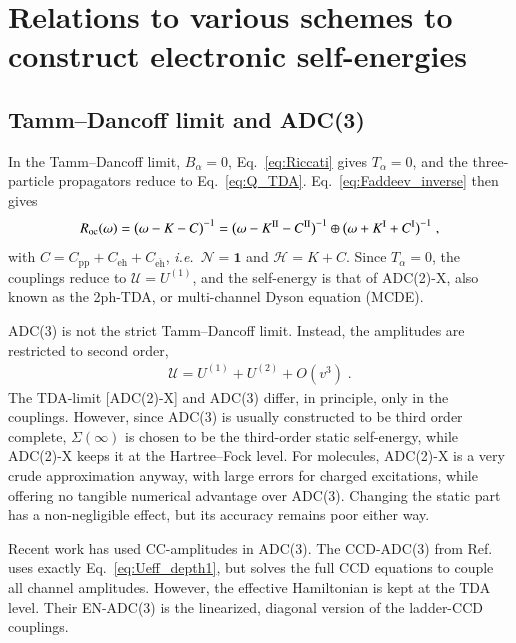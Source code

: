 \documentclass[aip,jcp,reprint,noshowkeys,superscriptaddress]{revtex4-1}
\newcommand{\ie}{\textit{i.e.}}
\newcommand{\bI}{\boldsymbol{1}}
\newcommand{\eh}{\text{eh}}
\newcommand{\teh}{\overline{\text{eh}}}
\newcommand{\pp}{\text{pp}}
\begin{document}
\section{Relations to various schemes to construct electronic self-energies}

\subsection{Tamm--Dancoff limit and ADC(3)}
\label{sec:adc3_tda}
In the Tamm--Dancoff limit, $B_\alpha=0$, Eq.~\eqref{eq:Riccati} gives
$T_\alpha=0$, and the three-particle propagators reduce to
Eq.~\eqref{eq:Q_TDA}. Eq.~\eqref{eq:Faddeev_inverse} then gives
\begin{equation}
R_{\rm oc}(\omega)
=
\big(\omega-K-C\big)^{-1}
=
\big(\omega-K^{\rm II}-C^{\rm II}\big)^{-1}\oplus
\big(\omega+K^{\rm I}+C^{\rm I}\big)^{-1} \;,
\label{eq:R_TDA}
\end{equation}
with $C=C_{\pp}+C_{\eh}+C_{\teh}$, \ie\ $\mathcal N=\bI$ and
$\mathcal H=K+C$. Since $T_\alpha=0$, the couplings reduce to
$\mathcal U=U^{(1)}$, and the self-energy is that of
ADC(2)-X,\cite{von1984computational} also known as the 
2ph-TDA,\cite{Cederbaum1977,
cederbaum1977theoretical,
schirmer1978two} or multi-channel Dyson equation (MCDE).
\cite{Riva2023,Riva2024,Riva2025}

ADC(3) is not the strict Tamm--Dancoff limit. Instead, 
the amplitudes are restricted to second order,
\begin{equation}
\begin{aligned}
\mathcal U
=
U^{(1)}+U^{(2)}+O(v^3) \;.
\end{aligned}
\nonumber
\end{equation}
The TDA-limit [ADC(2)-X] and ADC(3) differ, in principle,
only in the couplings. However, since ADC(3) is usually constructed to 
be third order complete, $\Sigma(\infty)$ is chosen to be the 
third-order static self-energy, while ADC(2)-X keeps it at the 
Hartree--Fock level. For molecules, ADC(2)-X is a very crude approximation anyway, with 
large errors for charged excitations, while offering no tangible numerical 
advantage over ADC(3). Changing the static part has a non-negligible effect, 
but its accuracy remains poor either way.\cite{Keizer2026}

Recent work has used CC-amplitudes in ADC(3).
The CCD-ADC(3) from Ref.~ 
uses exactly Eq.~\eqref{eq:Ueff_depth1}, but solves the 
full CCD equations to couple all channel amplitudes. However,
the effective Hamiltonian is kept at the TDA level. Their 
EN-ADC(3) is the linearized, diagonal version of the ladder-CCD couplings.
\end{document}
